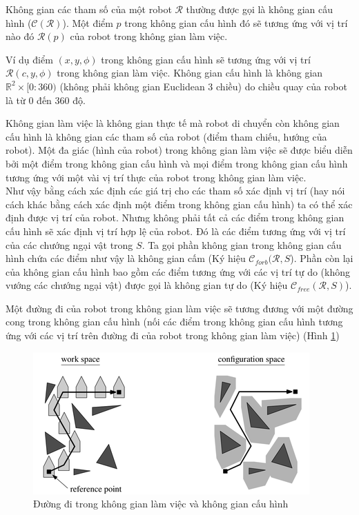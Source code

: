 \documentclass[a4paper,12pt]{report}
\begin{document}
Không gian các tham số của một robot $\mathcal{R}$ thường được gọi là không gian cấu hình ($\mathcal{C}(\mathcal{R})$). Một điểm $p$ trong không gian cấu hình đó sẽ tương ứng với vị trí nào đó $\mathcal{R}(p)$ của robot trong không gian làm việc.
\par Ví dụ điểm $(x,y,\phi)$ trong không gian cấu hình sẽ tương ứng với vị trí $\mathcal{R}(c,y,\phi)$ trong không gian làm việc. Không gian cấu hình là không gian $\mathbb{R}^2\times[0:360)$ (không phải không gian Euclidean 3 chiều) do chiều quay của robot là từ 0 đến 360 độ.
\par Không gian làm việc là không gian thực tế mà robot di chuyển còn không gian cấu hình là không gian các tham số của robot (điểm tham chiếu, hướng của robot). Một đa giác (hình của robot) trong không gian làm việc sẽ được biểu diễn bởi một điểm trong không gian cấu hình và mọi điểm trong không gian cấu hình tương ứng với một vài vị trí thực của robot trong không gian làm việc.\\[0.6em]
Như vậy bằng cách xác định các giá trị cho các tham số xác định vị trí (hay nói cách khác bằng cách xác định một điểm trong không gian cấu hình) ta có thể xác định được vị trí của robot. Nhưng không phải tất cả các điểm trong không gian cấu hình sẽ xác định vị trí hợp lệ của robot. Đó là các điểm tương ứng với vị trí của các chướng ngại vật trong $S$. Ta gọi phần không gian trong không gian cấu hình chứa các điểm như vậy là không gian cấm (Ký hiệu $\mathcal{C}_{forb}(\mathcal{R},S$). Phần còn lại của không gian cấu hình bao gồm các điểm tương ứng với các vị trí tự do (không vướng các chướng ngại vật) được gọi là không gian tự do (Ký hiệu $\mathcal{C}_{free}(\mathcal{R},S)$).
\par Một đường đi của robot trong không gian làm việc sẽ tương đương với một đường cong trong không gian cấu hình (nối các điểm trong không gian cấu hình tương ứng với các vị trí trên đường đi của robot trong không gian làm việc) (Hình \ref{fig_path})
\begin{figure}[H]
\centering
\includegraphics[scale=1]{path.png}
\caption{Đường đi trong không gian làm việc và không gian cấu hình}
\label{fig_path}
\end{figure}
\end{document}
